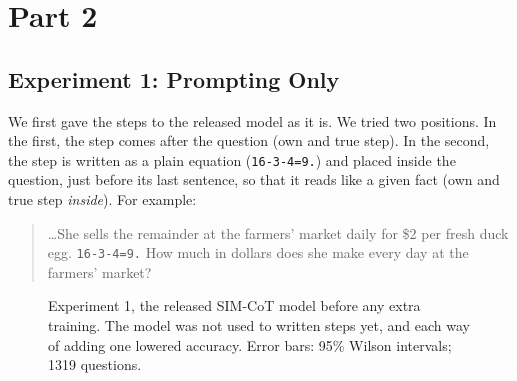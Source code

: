 \documentclass[10pt,letterpaper]{article}
\newcommand{\step}[1]{\texttt{\small #1}}
\begin{document}
\section{Part 2}
\subsection{Experiment 1: Prompting Only}
We first gave the steps to the released model as it is. We tried two positions. In the first, the step comes after
the question (own and true step). In the second, the step is written as a plain equation (\step{16-3-4=9.}) and
placed inside the question, just before its last sentence, so that it reads like a given fact (own and true step
\emph{inside}). For example:
\begin{quote}\small
\dots She sells the remainder at the farmers' market daily for \$2 per fresh duck egg. \step{16-3-4=9.} How much
in dollars does she make every day at the farmers' market?
\end{quote}

\begin{figure}[t]
\centering
{}
\caption{Experiment 1, the released SIM-CoT model before any extra training. The model was not used to written
steps yet, and each way of adding one lowered accuracy. Error bars: 95\% Wilson intervals; 1319 questions.}
\label{fig:prompt}
\end{figure}
\end{document}
